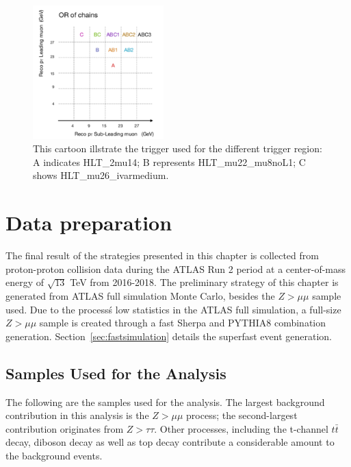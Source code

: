 \begin{figure}[!htb]
    \begin{center}
        \includegraphics[width=0.45\textwidth]{figures/chapter_dimuon/TriggerChain}        
        \caption{
        This cartoon illstrate the trigger used for the different trigger region: A indicates HLT\_2mu14; B represents HLT\_mu22\_mu8noL1; C shows HLT\_mu26\_ivarmedium. }
    \end{center}
\end{figure}
\FloatBarrier

\section{Data preparation}
The final result of the strategies presented in this chapter is collected from proton-proton collision data during the ATLAS Run 2 period at a center-of-mass energy of $\sqrt{13}$ TeV from 2016-2018. The preliminary strategy of this chapter is generated from ATLAS full simulation Monte Carlo, besides the $Z > \mu \mu $ sample used. Due to the process\'s low statistics in the ATLAS full simulation, a full-size $Z > \mu \mu$ sample is created through a fast Sherpa and PYTHIA8 combination
generation. Section~\ref{sec:fastsimulation} details the superfast event generation.

\subsection{Samples Used for the Analysis}
The following are the samples used for the analysis. The largest background contribution in this analysis is the $Z > \mu\mu $ process; the second-largest contribution originates from $Z > \tau \tau$. Other processes, including the t-channel $t\bar{t}$ decay, diboson decay as well as top decay contribute a considerable amount to the background events.

